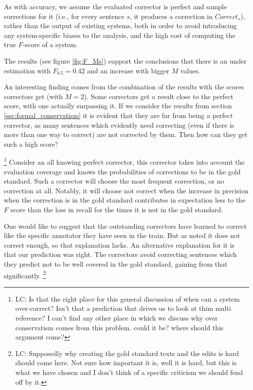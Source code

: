 \documentclass[letter,11pt]{article}
\newcommand{\oa}[1]{\footnote{\color{red}OA: #1}}
\newcommand{\lc}[1]{\footnote{\color{green}LC: #1}}
\begin{document}
		
		
		As with accuracy, we assume the evaluated corrector is perfect and sample corrections for it
		(i.e., for every sentence $s$, it produces a correction in $Correct_s$),
		rather than the output of existing systems, both
		in order to avoid introducing any system-specific biases to the analysis,
		and the high cost of computing the true $F$-score of a system.
		
		The results (see figure \ref{fig:F_Ms}) support the conclusions that there is an under estimation with $F_{0.5} = 0.42$ and an increase with bigger $M$ values.
		
		An interesting finding comes from the combination of the results with the scores correctors get (with $M=2$). Some correctors get a result close to the perfect score, with one actually surpassing it. If we consider the results from section \ref{sec:formal_conservatism} it is evident that they are far from being a perfect corrector, as many sentences which evidently need correcting (even if there is more than one way to correct) are not corrected by them. Then how can they get such a high score?
		
		\lc{Is that the right place for this general discussion of when can a system over-correct? Isn't that a prediction that drives us to look at thim multi reference? I can't find any other place in which we discuss why over conservatism comes from this problem. could it be? where should this argument come?}
		Consider an all knowing perfect corrector, this corrector takes into account the evaluation coverage and knows the probabilities of corrections to be in the gold standard. Such a corrector will choose the most frequent correction, or no correction at all.  Notably, it will choose not correct when the increase in precision when the correction is in the gold standard contributes in expectation less to the $F$ score than the loss in recall for the times it is not in the gold standard.
		
		One would like to suggest that the outstanding correctors have learned to correct like the specific annotator they have seen in the train. But as noted it does not correct enough, so that explanation lacks. An alternative explanation for it is that our prediction was right. The correctors avoid correcting sentences which they predict not to be well covered in the gold standard, gaining from that significantly.
		\lc{Supposedly why creating the gold standard texts and the edits is hard should come here. Not sure how important it is, well it is hard, but this is what we have chosen and I don't think of a specific criticism we should fend off by it.}
		
\end{document}
